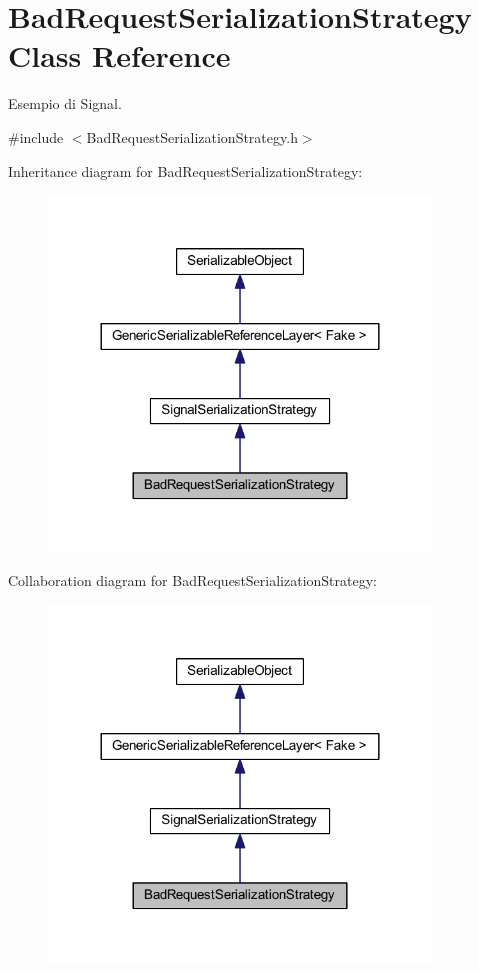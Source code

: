 \hypertarget{class_bad_request_serialization_strategy}{
\section{BadRequestSerializationStrategy Class Reference}
\label{class_bad_request_serialization_strategy}
}


Esempio di Signal.  




{\ttfamily \#include $<$BadRequestSerializationStrategy.h$>$}



Inheritance diagram for BadRequestSerializationStrategy:\nopagebreak
\begin{figure}[H]
\begin{center}
\leavevmode
\includegraphics[width=288pt]{class_bad_request_serialization_strategy__inherit__graph}
\end{center}
\end{figure}


Collaboration diagram for BadRequestSerializationStrategy:\nopagebreak
\begin{figure}[H]
\begin{center}
\leavevmode
\includegraphics[width=288pt]{class_bad_request_serialization_strategy__coll__graph}
\end{center}
\end{figure}
